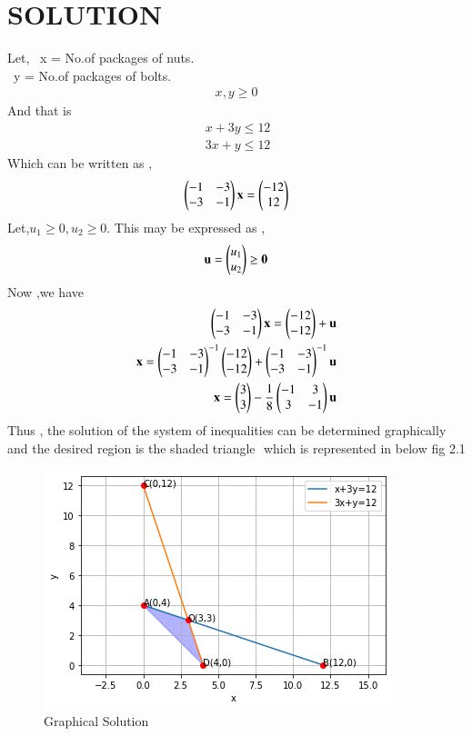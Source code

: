 \documentclass[journal,12pt,twocolumn]{IEEEtran}
\begin{document}
\section{SOLUTION} 
Let,
\ x = No.of packages of nuts.
\\
\ y = No.of packages of bolts.
\begin{align}
 x,y\geq 0
\end{align}
And that is
\begin{align}
\ x+3{y}\leq12
\\
\ 3{x}+y\leq12
\end{align}
Which can be written as ,
\begin{align}
\begin{pmatrix}-1 & -3 \\ -3 & -1\end{pmatrix}\mathbf{x} = \begin{pmatrix}-12 \\ 12\end{pmatrix}
\end{align}
Let,${u_1}\geq 0 , {u_2}\geq 0$. This may be expressed as ,
\begin{align}
\Vec{u} = \myvec{{u_1} \\ {u_2}}\geq \vec{0}
\end{align}
Now ,we have
\begin{align}
\begin{pmatrix}-1 & -3 \\ -3 & -1\end{pmatrix}\mathbf{x} = \begin{pmatrix}-12 \\ -12\end{pmatrix} + \mathbf{u}
\\
\mathbf{x} = \begin{pmatrix}-1 & -3 \\ -3 & -1\end{pmatrix}^{-1}\begin{pmatrix}-12 \\ -12\end{pmatrix} + \begin{pmatrix}-1 & -3 \\ -3 & -1\end{pmatrix}^{-1}\mathbf{u}
\\
\mathbf{x} = \begin{pmatrix}3 \\ 3\end{pmatrix} - \frac{1}{8}\begin{pmatrix}-1 & 3 \\ 3 & -1\end{pmatrix}\mathbf{u}
\end{align}
Thus , the solution of the system of inequalities can be determined graphically and the desired region is the shaded  triangle $\label{ref: Graphical Solution}$ which is represented in below fig 2.1
\begin{figure}[!ht]
\centering
\includegraphics[width=\columnwidth]{download (2).png}
\caption{Graphical Solution}
\label{fig: Graphical Solution}	
\end{figure}
\end{document}
